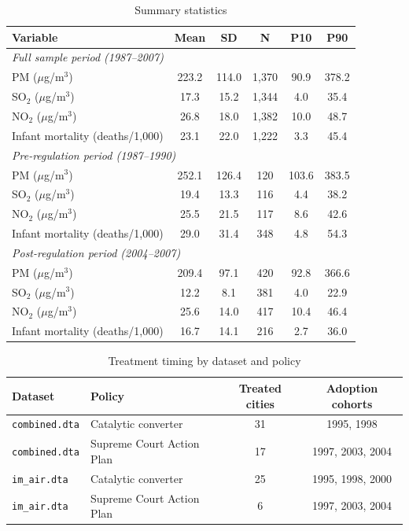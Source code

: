 \documentclass[10pt]{article}
\begin{document}
\begin{table}[H]
\centering
\caption{Summary statistics}
\label{tab:sumstats}
\begin{tabular}{lccccc}
\toprule
Variable & Mean & SD & N & P10 & P90 \\
\midrule
\multicolumn{6}{l}{\textit{Full sample period (1987--2007)}} \\
PM ($\mu$g/m$^3$) & 223.2 & 114.0 & 1,370 & 90.9 & 378.2 \\
SO$_2$ ($\mu$g/m$^3$) & 17.3 & 15.2 & 1,344 & 4.0 & 35.4 \\
NO$_2$ ($\mu$g/m$^3$) & 26.8 & 18.0 & 1,382 & 10.0 & 48.7 \\
Infant mortality (deaths/1,000) & 23.1 & 22.0 & 1,222 & 3.3 & 45.4 \\
\midrule
\multicolumn{6}{l}{\textit{Pre-regulation period (1987--1990)}} \\
PM ($\mu$g/m$^3$) & 252.1 & 126.4 & 120 & 103.6 & 383.5 \\
SO$_2$ ($\mu$g/m$^3$) & 19.4 & 13.3 & 116 & 4.4 & 38.2 \\
NO$_2$ ($\mu$g/m$^3$) & 25.5 & 21.5 & 117 & 8.6 & 42.6 \\
Infant mortality (deaths/1,000) & 29.0 & 31.4 & 348 & 4.8 & 54.3 \\
\midrule
\multicolumn{6}{l}{\textit{Post-regulation period (2004--2007)}} \\
PM ($\mu$g/m$^3$) & 209.4 & 97.1 & 420 & 92.8 & 366.6 \\
SO$_2$ ($\mu$g/m$^3$) & 12.2 & 8.1 & 381 & 4.0 & 22.9 \\
NO$_2$ ($\mu$g/m$^3$) & 25.6 & 14.0 & 417 & 10.4 & 46.4 \\
Infant mortality (deaths/1,000) & 16.7 & 14.1 & 216 & 2.7 & 36.0 \\
\bottomrule
\end{tabular}
\end{table}

\begin{table}[H]
\centering
\caption{Treatment timing by dataset and policy}
\label{tab:timing}
\begin{tabular}{llcc}
\toprule
Dataset & Policy & Treated cities & Adoption cohorts \\
\midrule
\texttt{combined.dta} & Catalytic converter & 31 & 1995, 1998 \\
\texttt{combined.dta} & Supreme Court Action Plan & 17 & 1997, 2003, 2004 \\
\texttt{im\_air.dta} & Catalytic converter & 25 & 1995, 1998, 2000 \\
\texttt{im\_air.dta} & Supreme Court Action Plan & 6 & 1997, 2003, 2004 \\
\bottomrule
\end{tabular}
\end{table}
\end{document}
